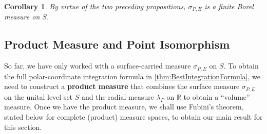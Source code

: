 \documentclass[11pt, letter]{book}
\newtheorem{corollary}[theorem]{Corollary}
\begin{document}
\begin{framed}
\begin{corollary}
By virtue of the two preceding propositions, $\sigma_{P,E}$ is a finite Borel measure on $S$.
\end{corollary}
\end{framed}




\subsection{Product Measure and Point Isomorphism}\label{subsec:ProductMeasure}
So far, we have only worked with a surface-carried measure $\sigma_{P,E}$ on $S$. To obtain the full polar-coordinate integration formula in \ref{thm:BestIntegrationFormula}, we need to construct a \textbf{product measure} that combines the surface measure $\sigma_{P,E}$ on the unital level set $S$ and the radial measure $\lambda_P$ on $\mathbb{R}$ to obtain a ``volume'' measure. Once we have the product measure, we shall use Fubini's theorem, stated below for complete (product) measure spaces, to obtain our main result for this section. \\
\end{document}
